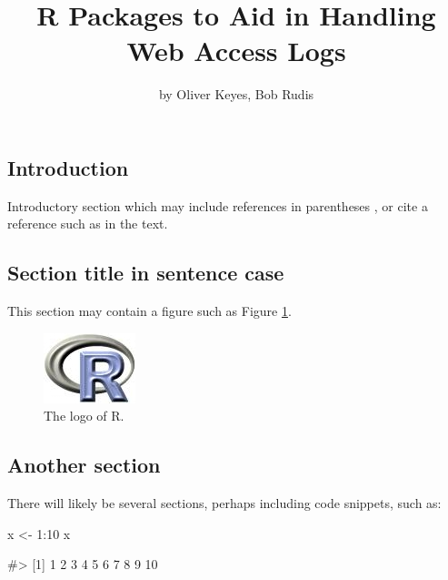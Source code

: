 \title{R Packages to Aid in Handling Web Access Logs}
\author{by Oliver Keyes, Bob Rudis}

\maketitle


\subsection{Introduction}\label{introduction}

Introductory section which may include references in parentheses
\citep{R}, or cite a reference such as \citet{R} in the text.

\subsection{Section title in sentence
case}\label{section-title-in-sentence-case}

This section may contain a figure such as Figure \ref{figure:rlogo}.

\begin{figure}[htbp]
  \centering
  \includegraphics{Rlogo}
  \caption{The logo of R.}
  \label{figure:rlogo}
\end{figure}

\subsection{Another section}\label{another-section}

There will likely be several sections, perhaps including code snippets,
such as:

\begin{Schunk}
\begin{Sinput}
x <- 1:10
x
\end{Sinput}
\begin{Soutput}
#>  [1]  1  2  3  4  5  6  7  8  9 10
\end{Soutput}
\end{Schunk}

